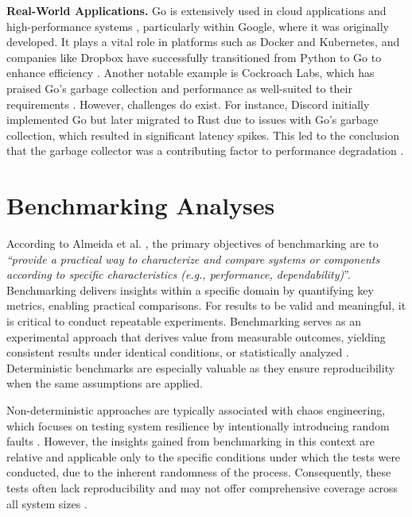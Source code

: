 \textbf{Real-World Applications.} Go is extensively used in cloud applications and high-performance systems \cite{Zhao2023}, particularly within Google, where it was originally developed. It plays a vital role in platforms such as Docker and Kubernetes, and companies like Dropbox have successfully transitioned from Python to Go to enhance efficiency \cite{go-docs}. Another notable example is Cockroach Labs, which has praised Go's garbage collection and performance as well-suited to their requirements \cite{go-docs}. However, challenges do exist. For instance, Discord initially implemented Go but later migrated to Rust due to issues with Go's garbage collection, which resulted in significant latency spikes. This led to the conclusion that the garbage collector was a contributing factor to performance degradation \cite{discord-blog-rust-go}.

\section{Benchmarking Analyses}

According to Almeida et al. \cite{Almeida2013}, the primary objectives of benchmarking are to \textit{“provide a practical way to characterize and compare systems or components according to specific characteristics (e.g., performance, dependability)}”. Benchmarking delivers insights within a specific domain by quantifying key metrics, enabling practical comparisons. For results to be valid and meaningful, it is critical to conduct repeatable experiments. Benchmarking serves as an experimental approach that derives value from measurable outcomes, yielding consistent results under identical conditions, or statistically analyzed \cite{Almeida2013, Blessing2019}. Deterministic benchmarks are especially valuable as they ensure reproducibility when the same assumptions are applied.

Non-deterministic approaches are typically associated with chaos engineering, which focuses on testing system resilience by intentionally introducing random faults \cite{Randtoul2022}. However, the insights gained from benchmarking in this context are relative and applicable only to the specific conditions under which the tests were conducted, due to the inherent randomness of the process. Consequently, these tests often lack reproducibility and may not offer comprehensive coverage across all system sizes \cite{Almeida2013}.

